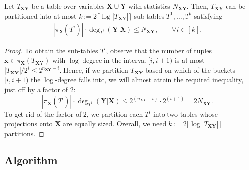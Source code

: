 \documentclass{theoretics}
\begin{document}
\begin{lemma}
Let $T_{\bm X\bm Y}$ be a table over variables $\bm X \cup \bm Y$ with statistics $N_{\bm X\bm Y}$.
Then, $T_{\bm X\bm Y}$ can be partitioned into at most
$k := 2 \lceil \log |T_{\bm X\bm Y}| \rceil $ sub-tables $T^{1},\dots,T^{k}$
satisfying
\begin{align}
  |\pi_{\bm X}(T^{i})| \cdot \deg_{T^{i}}(\bm Y |\bm X) \leq N_{\bm X\bm Y}, \quad\quad \forall i \in [k].
  \label{eq:partition}
\end{align}
\label{lmm:partition}
\end{lemma}
\begin{proof}
To obtain the sub-tables $T^{i}$, observe that the number of tuples $\bm x \in
\pi_{\bm X}(T_{\bm X\bm Y})$ with $\log$-degree in the interval
$[i,i+1)$ is at most $|T_{\bm X\bm Y}|/2^i \leq 2^{n_{\bm X\bm Y}-i}$.
Hence, if we partition $T_{\bm X\bm Y}$ based on which of the buckets $[i,i+1)$ the
$\log$-degree falls into, we will almost attain the required inequality, just off by a factor of $2$:
\[ |\pi_{\bm X}(T^{i})| \cdot \deg_{T^{i}}(\bm Y |\bm X)  \leq 2^{(n_{\bm X\bm Y}-i)}\cdot2^{(i+1)} = 2N_{\bm X\bm Y}. \]
To get rid of the factor of $2$, we partition each $T^{i}$ into two
tables whose projections onto $\bm X$ are equally sized. Overall, we need
$k := 2\lceil \log |T_{\bm X\bm Y}| \rceil$ partitions.
\end{proof}

\subsection{Algorithm}
\label{subsec:algorithm}
\end{document}
